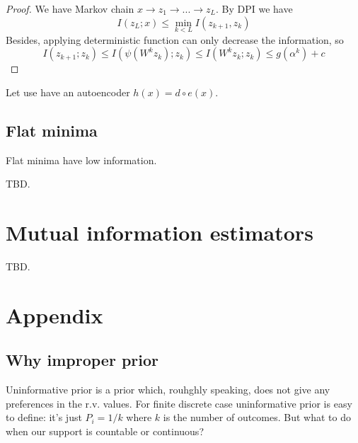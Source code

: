 \documentclass{article}
\begin{document}
\begin{proof}
We have Markov chain $x \to z_1 \to ... \to z_L$.
By DPI we have
\[
I(z_L;x) \leq \min_{k < L} I(z_{k+1}, z_k)
\]
Besides, applying deterministic function can only decrease the information, so
\[
I(z_{k+1}; z_k) \leq I(\psi(W^k z_k); z_k) \leq I(W^k z_k; z_k) \leq g(\alpha^k) + c
\]
\end{proof}


\begin{theorem}
Let use have an autoencoder $h(x) = d \circ e(x)$.
\end{theorem}

\subsection*{Flat minima}
\begin{theorem}
Flat minima have low information.
\end{theorem}
TBD.

\section{Mutual information estimators}
TBD.
%
%
%

\section{Appendix}
\subsection*{Why improper prior}
Uninformative prior is a prior which, rouhghly speaking, does not give any preferences in the r.v. values.
For finite discrete case uninformative prior is easy to define: it's just $P_i = 1/k$ where $k$ is the number of outcomes.
But what to do when our support is countable or continuous?
\end{document}
